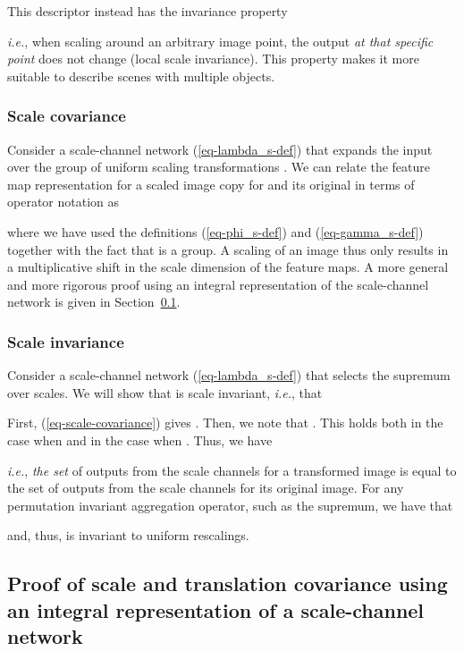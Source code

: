 \documentclass[twocolumn,runningheads]{svjour3}
\begin{document}
This descriptor instead has the invariance property

{\em i.e.\/}, when scaling around an
arbitrary image point, the output {\em at that specific point\/} does
not change (local scale invariance). This property makes it more
suitable to describe scenes with multiple objects. 

\subsubsection{Scale covariance}

Consider a scale-channel network  (\ref{eq-lambda_s-def})
that expands the input over the group of uniform scaling transformations . 
We can relate the feature map representation  
for a scaled image copy  for  and its original 
in terms of operator notation as

where we have used the definitions (\ref{eq-phi_s-def}) and
(\ref{eq-gamma_s-def}) together with the fact that  is a group. A
scaling of an image thus only results in a multiplicative shift in the
scale dimension of the feature maps. A more general and more rigorous
proof using an integral representation of the scale-channel network is
given in Section~\ref{sec-invariance-covariance-proof}. 

\subsubsection{Scale invariance}
\label{sec-scale-invariance}

Consider a scale-channel network 
(\ref{eq-lambda_s-def}) that selects the supremum over scales. We will
show that  is scale invariant, {\em i.e.\/}, that

First, (\ref{eq-scale-covariance}) gives . 
Then, we note that . 
This holds both in the case when  and in the case 
when .
Thus, we have

{\em i.e.\/}, \emph{the set} of outputs from the scale channels for a
transformed image is equal to the set of outputs from the 
scale channels for its original image.  
For any permutation invariant aggregation operator, 
such as the supremum, we have that
 
and, thus,  is invariant to uniform rescalings. 

\subsection{Proof of scale and translation covariance using an integral representation of a scale-channel network}
\label{sec-invariance-covariance-proof}
\end{document}
